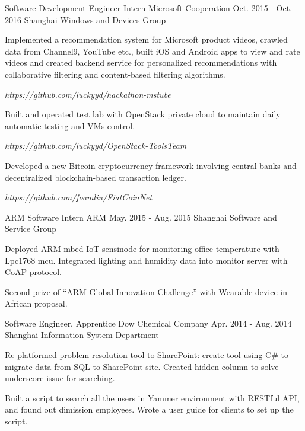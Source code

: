 \begin{cventries}
  \cventry
    {Software Development Engineer Intern}
    {Microsoft Cooperation}
    {Oct. 2015 - Oct. 2016}
    {Shanghai}
    {Windows and Devices Group}
    {
      \begin{cvitems}
        \item {Implemented a recommendation system for Microsoft product videos, crawled data from Channel9, YouTube etc., built iOS and Android apps to view and rate videos and created backend service for personalized recommendations with collaborative filtering and content-based filtering algorithms.}
        \item[] {\color{red} \emph {https://github.com/luckyyd/hackathon-mstube}}
        \item {Built and operated test lab with OpenStack private cloud to maintain daily automatic testing and VMs control.}
        \item[] {\color{red} \emph {https://github.com/luckyyd/OpenStack-ToolsTeam}}
        \item {Developed a new Bitcoin cryptocurrency framework involving central banks and decentralized blockchain-based transaction ledger.}
        \item[] {\color{red} \emph {https://github.com/foamliu/FiatCoinNet}}
      \end{cvitems}
    }
  \cventry
    {ARM Software Intern}
    {ARM}
    {May. 2015 - Aug. 2015}
    {Shanghai}
    {Software and Service Group}
    {
      \begin{cvitems}
        \item {Deployed ARM mbed IoT sensinode for monitoring office temperature with Lpc1768 mcu. Integrated lighting and humidity data into monitor server with CoAP protocol.}
        \item {Second prize of “ARM Global Innovation Challenge” with Wearable device in African proposal.}
      \end{cvitems}
    }
  \cventry
    {Software Engineer, Apprentice}
    {Dow Chemical Company}
    {Apr. 2014 - Aug. 2014}
    {Shanghai}
    {Information System Department}
    {
      \begin{cvitems}
        \item {Re-platformed problem resolution tool to SharePoint: create tool using C\# to migrate data from SQL to SharePoint site. Created hidden column to solve underscore issue for searching.}
        \item {Built a script to search all the users in Yammer environment with RESTful API, and found out dimission employees. Wrote a user guide for clients to set up the script.}
      \end{cvitems} 
    }
\end{cventries}
